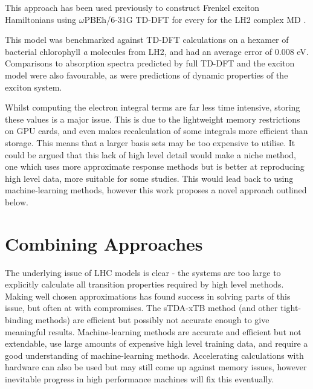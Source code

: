 This approach has been used previously to construct Frenkel exciton Hamiltonians
using $\omega\text{PBEh}$/6-31G TD-DFT for every for the LH2 complex MD \cite{Sisto2017}.

This model was benchmarked against TD-DFT calculations on a hexamer of bacterial
chlorophyll \emph{a} molecules from LH2, and had an average error of 0.008 eV. Comparisons
to absorption spectra predicted by full TD-DFT and the exciton model were also favourable, 
as were predictions of dynamic properties of the exciton system.

Whilst computing the electron integral terms are far less time intensive, storing
these values is a major issue. This is due to the lightweight memory restrictions
on GPU cards, and even makes recalculation of some integrals more efficient than
storage. This means that a larger basis sets may be too expensive to utilise. It
could be argued that this lack of high level detail would make a niche method, one
which uses more approximate response methods but is better at reproducing high level
data, more suitable for some studies. This would lead back to using machine-learning
methods, however this work proposes a novel approach outlined below.

\section{Combining Approaches}
\label{sec:possible_novel_methods}

The underlying issue of LHC models is clear - the systems are too large to explicitly
calculate all transition properties required by high level methods. Making well 
chosen approximations has found success in solving parts of this issue, but often
at with compromises. The sTDA-xTB method (and other tight-binding methods) are efficient
but possibly not accurate enough to give meaningful results. Machine-learning methods
are accurate and efficient but not extendable, use large amounts of expensive high
level training data, and require a good understanding of machine-learning methods.
Accelerating calculations with hardware can also be used but may still come up against
memory issues, however inevitable progress in high performance machines will fix 
this eventually.

